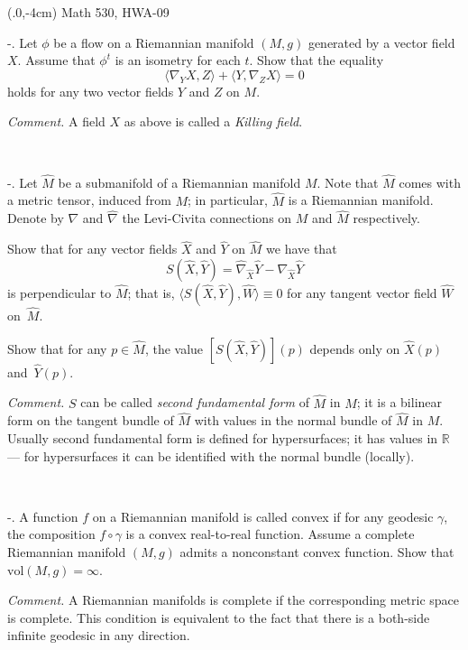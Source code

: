 \documentclass[a4paper,10pt]{article}
\def\RR{\mathbb{R}}%
\def\vol{\mathrm{vol}}%
\begin{document}
\pagestyle{empty}
\begin{textblock*}{150mm}(.0\textwidth,-4cm)
\hfill
Math 530, HWA-09
\end{textblock*}

\vskip-15mm

-. Let $\phi$ be a flow on a Riemannian manifold $(M,g)$ generated by a vector field $X$. 
Assume that $\phi^t$ is an isometry for each $t$.
Show that the equality
\[\langle\nabla_YX,Z\rangle+\langle Y,\nabla_ZX\rangle=0\]
holds for any two vector fields $Y$ and $Z$ on $M$.

\medskip
\noindent\textit{Comment.} A field $X$ as above is called a \emph{Killing field}.


\ 

-. Let $\hat M$ be a submanifold of a Riemannian manifold $M$.
Note that $\hat M$ comes with a metric tensor, induced from $M$; in particular, $\hat M$ is a Riemannian manifold.
Denote by $\nabla$ and $\hat\nabla$ the Levi-Civita connections on $M$ and $\hat M$ respectively.

Show that for any vector fields $\hat X$ and $\hat Y$ on $\hat M$ we have that
\[S(\hat X,\hat Y)=\hat\nabla_{\hat X}{\hat Y}-\nabla_{\hat X}{\hat Y}\]
is perpendicular to $\hat M$;
that is, $\langle S(\hat X,\hat Y),\hat W\rangle\equiv0$ for any tangent vector field $\hat W$ on~$\hat M$.

Show that for any $p\in \hat M$, the value $[S(\hat X,\hat Y)](p)$ depends only on $\hat X(p)$ and~$\hat Y(p)$.

\medskip
\noindent\textit{Comment.} $S$ can be called \emph{second fundamental form} of $\hat M$ in $M$;
it is a bilinear form on the tangent bundle of $\hat M$ with values in the normal bundle of $\hat M$ in $M$.
Usually second fundamental form is defined for hypersurfaces; it has values in $\RR$ --- for hypersurfaces it can be identified with the normal bundle (locally).


\ 

-. A function $f$ on a Riemannian manifold is called convex if for any geodesic $\gamma$, the composition $f\circ\gamma$ is a convex real-to-real function.
Assume a complete Riemannian manifold $(M,g)$ admits a nonconstant convex function.
Show that $\vol(M,g)=\infty$.

\medskip
\noindent\textit{Comment.}
A Riemannian manifolds is complete if the corresponding metric space is complete.
This condition is equivalent to the fact that there is a both-side infinite geodesic in any direction.
\end{document}

